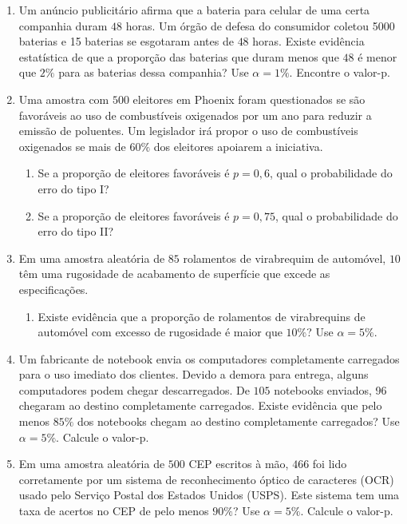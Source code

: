 \documentclass[12pt, a4paper]{article}
\begin{document}
\begin{enumerate}
	\item Um anúncio publicitário afirma que a bateria para celular de uma certa companhia duram $48$ horas. Um órgão de defesa do consumidor coletou 5000 baterias e  15 baterias se esgotaram antes de $48$ horas. Existe evidência estatística de que a proporção das baterias que duram menos que $48$ é menor que $2\%$ para as baterias dessa companhia? Use $\alpha=1\%$. Encontre o valor-p.
	
	\item Uma amostra com $500$ eleitores em Phoenix foram questionados se são favoráveis ao uso de combustíveis oxigenados por um ano para reduzir a emissão de poluentes. Um legislador irá propor o uso  de combustíveis oxigenados se mais de $60\%$ dos eleitores apoiarem a iniciativa.
	\begin{enumerate}
		\item Se a proporção de eleitores favoráveis é $p=0,6$, qual o probabilidade do erro do tipo I?
		\item Se a proporção de eleitores favoráveis é $p=0,75$, qual o probabilidade do erro do tipo II?
	\end{enumerate}

	\item Em uma amostra aleatória de $85$ rolamentos de virabrequim de automóvel, $10$ têm uma rugosidade de acabamento de superfície que excede as especificações.
	\begin{enumerate}
		\item Existe evidência que a proporção de rolamentos de virabrequins de automóvel com excesso de rugosidade é maior que $10\%$? Use $\alpha=5\%$.
	\end{enumerate}
	
	\item Um fabricante de notebook envia os computadores completamente carregados para o uso imediato dos clientes. Devido a demora para entrega, alguns computadores podem chegar descarregados. De $105$ notebooks enviados, 96 chegaram ao destino completamente carregados. Existe evidência que pelo menos $85\%$ dos notebooks chegam ao destino completamente carregados? Use $\alpha=5\%$. Calcule o valor-p.
	
	\item Em uma amostra aleatória de $500$ CEP escritos à mão, $466$ foi lido corretamente por um sistema de reconhecimento óptico de caracteres (OCR) usado pelo Serviço Postal dos Estados Unidos (USPS). Este sistema tem uma taxa de acertos no CEP de pelo menos $90\%$? Use $\alpha=5\%$. Calcule o valor-p.
	
	
\end{enumerate}
\end{document}
